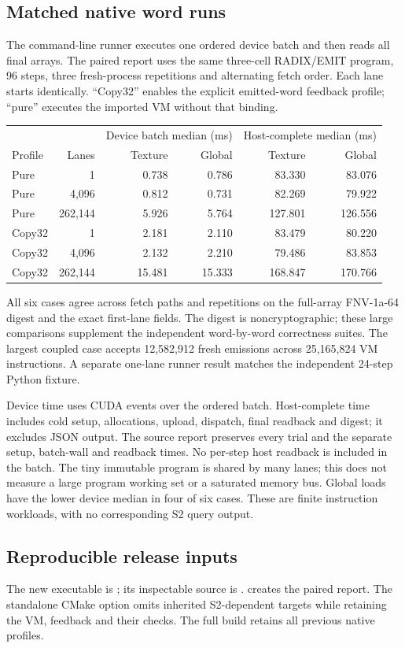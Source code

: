 \subsection{Matched native word runs}
The command-line runner executes one ordered device batch and then reads all
final arrays. The paired report uses the same three-cell RADIX/EMIT program,
96 steps, three fresh-process repetitions and alternating fetch order. Each
lane starts identically. ``Copy32'' enables the explicit emitted-word feedback
profile; ``pure'' executes the imported VM without that binding.

\begin{center}\small
\begin{tabular}{@{}l r r r r r@{}}
\toprule
 & & \multicolumn{2}{c}{Device batch median (ms)} &
\multicolumn{2}{c}{Host-complete median (ms)}\\
Profile & Lanes & Texture & Global & Texture & Global\\\midrule
Pure & 1 & 0.738 & 0.786 & 83.330 & 83.076\\
Pure & 4,096 & 0.812 & 0.731 & 82.269 & 79.922\\
Pure & 262,144 & 5.926 & 5.764 & 127.801 & 126.556\\
Copy32 & 1 & 2.181 & 2.110 & 83.479 & 80.220\\
Copy32 & 4,096 & 2.132 & 2.210 & 79.486 & 83.853\\
Copy32 & 262,144 & 15.481 & 15.333 & 168.847 & 170.766\\
\bottomrule
\end{tabular}\end{center}

All six cases agree across fetch paths and repetitions on the full-array
FNV-1a-64 digest and the exact first-lane fields. The digest is
noncryptographic; these large comparisons supplement the independent
word-by-word correctness suites. The largest coupled case accepts
12,582,912 fresh emissions across 25,165,824 VM instructions. A separate
one-lane runner result matches the independent 24-step Python fixture.

Device time uses CUDA events over the ordered batch. Host-complete time
includes cold setup, allocations, upload, dispatch, final readback and digest;
it excludes JSON output. The source report preserves every trial and the
separate setup, batch-wall and readback times. No per-step host readback is
included in the batch. The tiny immutable program is shared by many lanes;
this does not measure a large program working set or a saturated memory bus.
Global loads have the lower device median in four of six cases. These are
finite instruction workloads, with no corresponding S2 query output.

\subsection{Reproducible release inputs}
The new executable is ; its inspectable source is
.  creates the paired
report. The standalone CMake option  omits
inherited S2-dependent targets while retaining the VM, feedback and their
checks. The full build retains all previous native profiles.

\clearpage
